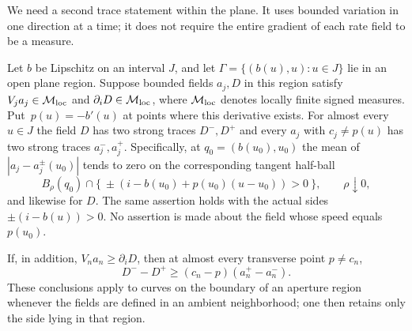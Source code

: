 We need a second trace statement within the plane.  It uses bounded
variation in one direction at a time; it does not require the entire
gradient of each rate field to be a measure.

\begin{lemma}
\label{lem:curve-traces}
Let $b$ be Lipschitz on an interval $J$, and let
$\Gamma=\{(b(u),u):u\in J\}$ lie in an open plane region.
Suppose bounded fields $a_j,D$ in this region satisfy
$V_ja_j\in\mathcal M_{\rm loc}$ and
$\partial_iD\in\mathcal M_{\rm loc}$, where $\mathcal M_{\rm loc}$
denotes locally finite signed measures. Put~$p(u)=-b'(u)$ at points
where this derivative exists.  For almost every $u\in J$ the field
$D$ has two strong traces $D^-,D^+$ and every $a_j$ with
$c_j\ne p(u)$ has two strong traces $a_j^-,a_j^+$.  Specifically, at
$q_0=(b(u_0),u_0)$ the mean of
$|a_j-a_j^\pm(u_0)|$ tends to zero on the corresponding tangent
half-ball
\[
 B_\rho(q_0)\cap
 \{\ \pm(i-b(u_0)+p(u_0)(u-u_0))>0\ \},
 \qquad\rho\downarrow0,
\]
and likewise for $D$.  The same assertion holds with the actual
sides $\pm(i-b(u))>0$.  No assertion is made about the field whose
speed equals $p(u_0)$.

If, in addition, $V_na_n\ge\partial_iD$, then at almost every
transverse point $p\ne c_n$,
\begin{equation}\label{eq:trace-curve-jump}
 D^- -D^+\ge(c_n-p)(a_n^+-a_n^-).
\end{equation}
These conclusions apply to curves on the boundary of an aperture
region whenever the fields are defined in an ambient neighborhood;
one then retains only the side lying in that region.
\end{lemma}

